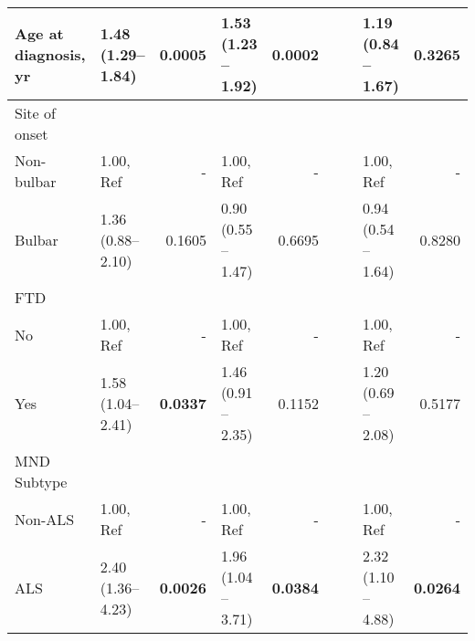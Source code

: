 \begin{sidewaystable}
{\begin{tabular}{|l|lr|lr|lr|lr|}
\hline
Age at diagnosis, yr & 1.48 (1.29--1.84) & \textbf{0.0005} & \textcolor[rgb]{0.2,0.2,0.2}{1.53 (1.23 -- 1.92)} & \textcolor[rgb]{0.2,0.2,0.2}{\textbf{0.0002}} & {\cellcolor[rgb]{0.753,0.753,0.753}} & {\cellcolor[rgb]{0.753,0.753,0.753}} & \textcolor[rgb]{0.2,0.2,0.2}{1.19 (0.84 -- 1.67)} & \textcolor[rgb]{0.2,0.2,0.2}{0.3265} \\ 
\hline
Site of onset &  &  &  &  & {\cellcolor[rgb]{0.753,0.753,0.753}} & {\cellcolor[rgb]{0.753,0.753,0.753}} &  &  \\
\hspace{5mm}Non-bulbar & 1.00, Ref & - & 1.00, Ref & - & {\cellcolor[rgb]{0.753,0.753,0.753}} & {\cellcolor[rgb]{0.753,0.753,0.753}} & 1.00, Ref & - \\
\hspace{5mm}Bulbar & 1.36 (0.88--2.10) & 0.1605 & \textcolor[rgb]{0.2,0.2,0.2}{0.90 (0.55 -- 1.47)} & \textcolor[rgb]{0.2,0.2,0.2}{0.6695} & {\cellcolor[rgb]{0.753,0.753,0.753}} & {\cellcolor[rgb]{0.753,0.753,0.753}} & \textcolor[rgb]{0.2,0.2,0.2}{0.94 (0.54 -- 1.64)} & \textcolor[rgb]{0.2,0.2,0.2}{0.8280} \\ 
\hline
FTD &  &  &  &  & {\cellcolor[rgb]{0.753,0.753,0.753}} & {\cellcolor[rgb]{0.753,0.753,0.753}} &  &  \\
\hspace{5mm}No & 1.00, Ref & - & 1.00, Ref & - & {\cellcolor[rgb]{0.753,0.753,0.753}} & {\cellcolor[rgb]{0.753,0.753,0.753}} & 1.00, Ref & - \\
\hspace{5mm}Yes & 1.58 (1.04--2.41) & \textbf{0.0337} & \textcolor[rgb]{0.2,0.2,0.2}{1.46 (0.91 -- 2.35)} & \textcolor[rgb]{0.2,0.2,0.2}{0.1152} & {\cellcolor[rgb]{0.753,0.753,0.753}} & {\cellcolor[rgb]{0.753,0.753,0.753}} & \textcolor[rgb]{0.2,0.2,0.2}{1.20 (0.69 -- 2.08)} & \textcolor[rgb]{0.2,0.2,0.2}{0.5177} \\ 
\hline
MND Subtype &  &  &  &  & {\cellcolor[rgb]{0.753,0.753,0.753}} & {\cellcolor[rgb]{0.753,0.753,0.753}} &  &  \\
\hspace{5mm}Non-ALS & 1.00, Ref & - & 1.00, Ref & - & {\cellcolor[rgb]{0.753,0.753,0.753}} & {\cellcolor[rgb]{0.753,0.753,0.753}} & 1.00, Ref & - \\
\hspace{5mm}ALS & 2.40 (1.36--4.23) & \textbf{0.0026} & \textcolor[rgb]{0.2,0.2,0.2}{1.96 (1.04 -- 3.71)} & \textcolor[rgb]{0.2,0.2,0.2}{\textbf{0.0384}} & {\cellcolor[rgb]{0.753,0.753,0.753}} & {\cellcolor[rgb]{0.753,0.753,0.753}} & \textcolor[rgb]{0.2,0.2,0.2}{2.32 (1.10 -- 4.88)} & \textcolor[rgb]{0.2,0.2,0.2}{\textbf{0.0264}} \\ 

\end{tabular}}
\end{sidewaystable}
